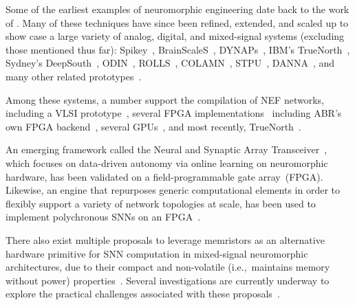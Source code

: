 Some of the earliest examples of neuromorphic engineering date back to the work of \citet{sivilotti1985novel, mead1988silicon, boahen1989heteroassociative, mahowald1991silicon}.
Many of these techniques have since been refined, extended, and scaled up to show case a large variety of analog, digital, and mixed-signal systems (excluding those mentioned thus far):
Spikey~\citep{pfeil2013six},
BrainScaleS~\citep{schemmel2010wafer, aamir2018mixed, aamir2018accelerated},
DYNAPs~\citep{moradi2018scalable},
IBM's TrueNorth~\citep{merolla2011digital, merolla2014million, esser2016convolutional},
Sydney's DeepSouth~\citep{cummings2018},
ODIN~\citep{frenkel2018},
ROLLS~\citep{qiao2015reconfigurable, glatz2018adaptive},
COLAMN~\citep{wijekoon2012vlsi},
STPU~\citep{smith2017novel},
DANNA~\citep{daffron2016extensions, mitchell2018danna},
and many other related prototypes~\citep[e.g.,][]{glackin2009hardware, moradi2011vlsi, brink2013computing, moradi2014event, park201465k, azghadi2015programmable, binas2016precise, kim2018efficient, chen20184096, zheng2018low, larras2018fully}.


Among these systems, a number support the compilation of NEF networks, including a VLSI prototype~\citep{corradi2014}, several FPGA implementations~\citep{naylor2013managing, wang2014compact, berzish2016, wang2017neuromorphic} including ABR's own FPGA backend~\citep{nengofpga}, several GPUs~\citep{bekolay2014, rasmussen2018nengodl, blouw2018a}, and most recently, TrueNorth~\citep{fischl2018}.

An emerging framework called the Neural and Synaptic Array Transceiver~\citep[NSAT;][]{detorakis2018neural}, which focuses on data-driven autonomy via online learning on neuromorphic hardware, has been validated on a field-programmable gate array~(FPGA).
Likewise, an engine that repurposes generic computational elements in order to flexibly support a variety of network topologies at scale, has been used to implement polychronous SNNs on an FPGA~\citep{wang2013neuromorphic, wang2018breaking}.

There also exist multiple proposals to leverage memristors as an alternative hardware primitive for SNN computation in mixed-signal neuromorphic architectures, due to their compact and non-volatile (i.e.,~maintains memory without power) properties~\citep{payvand2018neuromorphic}.
Several investigations are currently underway to explore the practical challenges associated with these proposals~\citep[e.g.,][]{chang2013building, kudithipudi2016design, cady2018full, boybat2018neuromorphic}.

